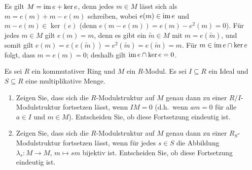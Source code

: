 \begin{solution}
  Es gilt $M = \operatorname{im} e + \ker e$, denn jedes $m \in M$ lässt sich als $m = e(m) + m - e(m)$ schreiben, wobei $e(m) \in \operatorname{im} e$ und $m - e(m) \in \ker(e)$ (denn $e(m - e(m)) = e(m) - e^2(m) = 0$).
  Für jedes $m \in M$ gilt $e(m) = m$, denn es gibt ein $\tilde{m} \in M$ mit $m = e(\tilde{m})$, und somit gilt $e(m) = e(e(\tilde{m})) = e^2(\tilde{m}) = e(\tilde{m}) = m$.
  Für $m \in \operatorname{im} e \cap \ker e$ folgt, dass $m = e(m) = 0$;
  deshalb gilt $\operatorname{im} e \cap \ker e = 0$.
\end{solution}


\begin{question}
  Es sei $R$ ein kommutativer Ring und $M$ ein $R$-Modul.
  Es sei $I \subseteq R$ ein Ideal und $S \subseteq R$ eine multiplikative Menge.
  \begin{enumerate}
    \item
      Zeigen Sie, dass sich die $R$-Modulstruktur auf $M$ genau dann zu einer $R/I$-Modulstruktur fortsetzen lässt, wenn $IM =  0$ (d.h.\ wenn $am = 0$ für alle $a \in I$ und $m \in M$).
      Entscheiden Sie, ob diese Fortsetzung eindeutig ist.
    \item
      Zeigen Sie, dass sich die $R$-Modulstruktur auf $M$ genau dann zu einer $R_S$-Modulstruktur fortsetzen lässt, wenn für jedes $s \in S$ die Abbildung $\lambda_s \colon M \to M$, $m \mapsto sm$ bijektiv ist.
      Entscheiden Sie, ob diese Fortsetzung eindeutig ist.
  \end{enumerate}
\end{question}


